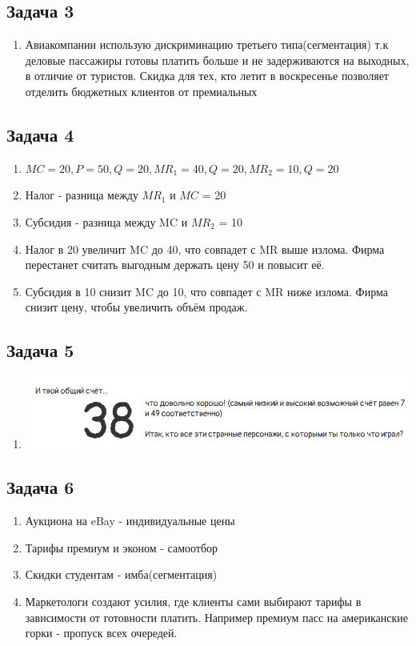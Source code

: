\documentclass[a4paper,12pt]{article}
\begin{document}
\subsection{Задача 3}
\begin{enumerate}
    \item Авиакомпании использую дискриминацию третьего типа(сегментация) т.к деловые пассажиры готовы платить больше и не задерживаются на выходных, в отличие от туристов. Скидка для тех, кто летит в воскресенье позволяет отделить бюджетных клиентов от премиальных
\end{enumerate}

\subsection{Задача 4}
\begin{enumerate}
    \item $MC = 20, P=50, Q=20, MR_1 = 40, Q=20, MR_2=10, Q=20$
    \item Налог - разница между $MR_1$ и $MC$ = 20
    \item Субсидия - разница между MC и $MR_2$ = 10
    \item Налог в 20 увеличит MC до 40, что совпадет с MR выше излома. Фирма перестанет считать выгодным держать цену 50 и повысит её.
    \item Субсидия в 10 снизит MC до 10, что совпадет с MR ниже излома. Фирма снизит цену, чтобы увеличить объём продаж.
\end{enumerate}

\subsection{Задача 5}
\begin{enumerate}
    \item \includegraphics[scale=0.45]{graphs/8.1.png}
\end{enumerate}

\subsection{Задача 6}
\begin{enumerate}
    \item Аукциона на eBay - индивидуальные цены
    \item Тарифы премиум и эконом - самоотбор
    \item Скидки студентам - имба(сегментация)
    \item Маркетологи создают усилия, где клиенты сами выбирают тарифы в зависимости от готовности платить. Например премиум пасс на американские горки - пропуск всех очередей.
\end{enumerate}
\end{document}
